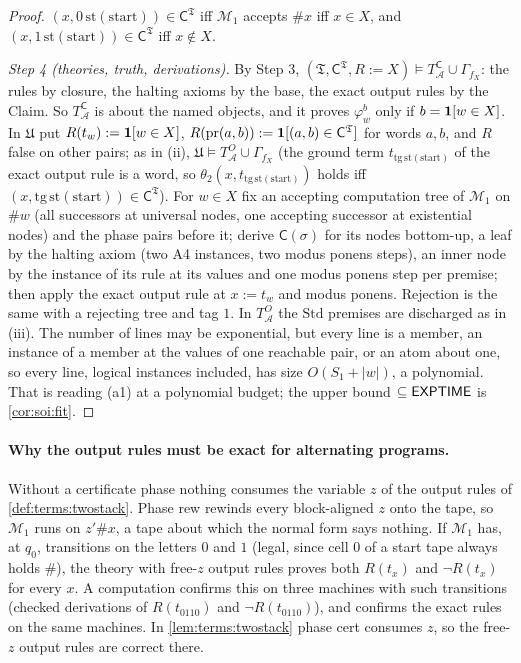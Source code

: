 \begin{proof}
$(x,0\,\mathrm{st}(\mathrm{start}))\in\mathsf C^{\mathfrak T}$ iff $\mathcal M_1$ accepts $\#x$ iff $x\in X$, and $(x,1\,\mathrm{st}(\mathrm{start}))\in\mathsf C^{\mathfrak T}$ iff $x\notin X$.

\emph{Step 4 (theories, truth, derivations).} By Step 3, $(\mathfrak T,\mathsf C^{\mathfrak T},R:=X)\models T^{\mathsf C}_{\mathcal A}\cup\Gamma_{f_X}$: the rules by closure, the halting axioms by the base, the exact output rules by the Claim. So $T^{\mathsf C}_{\mathcal A}$ is about the named objects, and it proves $\varphi_w^b$ only if $b=\mathbf{1}[w\in X]$. In $\mathfrak U$ put $R(t_w):=\mathbf{1}[w\in X]$, $R(\mathrm{pr}(a,b)):=\mathbf{1}[(a,b)\in\mathsf C^{\mathfrak T}]$ for words $a,b$, and $R$ false on other pairs; as in (ii), $\mathfrak U\models T^O_{\mathcal A}\cup\Gamma_{f_X}$ (the ground term $t_{\mathrm{tg}\,\mathrm{st}(\mathrm{start})}$ of the exact output rule is a word, so $\theta_2(x,t_{\mathrm{tg}\,\mathrm{st}(\mathrm{start})})$ holds iff $(x,\mathrm{tg}\,\mathrm{st}(\mathrm{start}))\in\mathsf C^{\mathfrak T}$). For $w\in X$ fix an accepting computation tree of $\mathcal M_1$ on $\#w$ (all successors at universal nodes, one accepting successor at existential nodes) and the phase pairs before it; derive $\mathsf C(\sigma)$ for its nodes bottom-up, a leaf by the halting axiom (two A4 instances, two modus ponens steps), an inner node by the instance of its rule at its values and one modus ponens step per premise; then apply the exact output rule at $x:=t_w$ and modus ponens. Rejection is the same with a rejecting tree and tag $1$. In $T^O_{\mathcal A}$ the $\mathrm{Std}$ premises are discharged as in (iii). The number of lines may be exponential, but every line is a member, an instance of a member at the values of one reachable pair, or an atom about one, so every line, logical instances included, has size $O(S_1+\lvert w\rvert)$, a polynomial. That is reading (a1) at a polynomial budget; the upper bound $\subseteq\mathsf{EXPTIME}$ is \cref{cor:soi:fit}.
\end{proof}

\paragraph{Why the output rules must be exact for alternating programs.} Without a certificate phase nothing consumes the variable $z$ of the output rules of \cref{def:terms:twostack}. Phase rew rewinds every block-aligned $z$ onto the tape, so $\mathcal M_1$ runs on $z'\#x$, a tape about which the normal form says nothing. If $\mathcal M_1$ has, at $q_0$, transitions on the letters $0$ and $1$ (legal, since cell $0$ of a start tape always holds $\#$), the theory with free-$z$ output rules proves both $R(t_x)$ and $\neg R(t_x)$ for every $x$. A computation confirms this on three machines with such transitions (checked derivations of $R(t_{0110})$ and $\neg R(t_{0110})$), and confirms the exact rules on the same machines. In \cref{lem:terms:twostack} phase cert consumes $z$, so the free-$z$ output rules are correct there.

